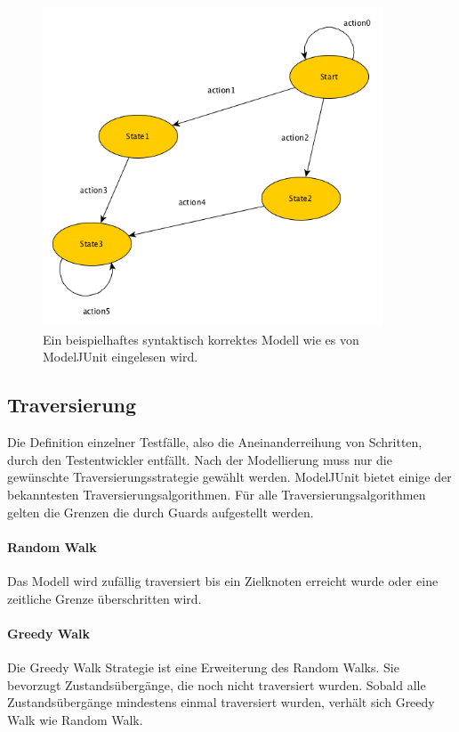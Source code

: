 \begin{figure}[h] 
  \centering
     \includegraphics[width=0.9\textwidth]{figures/modelljunit_modell.png}
  \caption{Ein beispielhaftes syntaktisch korrektes Modell wie es von ModelJUnit eingelesen wird.}
  \label{fig:modeljunit}
\end{figure}

\subsection{Traversierung}
Die Definition einzelner Testfälle, also die Aneinanderreihung von Schritten, durch den Testentwickler entfällt. Nach der Modellierung muss nur die gewünschte Traversierungsstrategie gewählt werden. ModelJUnit bietet einige der bekanntesten Traversierungsalgorithmen. Für alle Traversierungsalgorithmen gelten die Grenzen die durch Guards aufgestellt werden.

\paragraph{Random Walk}
Das Modell wird zufällig traversiert bis ein Zielknoten erreicht wurde oder eine zeitliche Grenze überschritten wird.

\paragraph{Greedy Walk}
Die Greedy Walk Strategie ist eine Erweiterung des Random Walks. Sie bevorzugt Zustandsübergänge, die noch nicht traversiert wurden. Sobald alle Zustandsübergänge mindestens einmal traversiert wurden, verhält sich Greedy Walk wie Random Walk.


